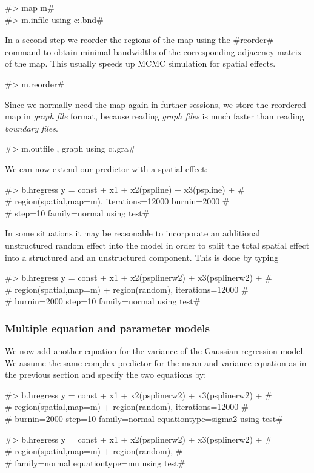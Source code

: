 #> map m# \\
#> m.infile using c:\maps\map.bnd#

In a second step we reorder the regions of the map using the
#reorder# command to obtain minimal bandwidths of the
corresponding adjacency matrix of the map. This usually speeds up
MCMC simulation for spatial effects.

#> m.reorder#

Since we normally need the map again in further sessions, we store
the reordered map in {\em graph file} format, because reading {\em
graph files} is much faster than reading {\em boundary files}.

#> m.outfile , graph using c:\maps\mapgraph.gra#

We can now extend our predictor with a spatial effect:

#> b.hregress y = const + x1 + x2(pspline) + x3(pspline) + # \\
#  region(spatial,map=m), iterations=12000 burnin=2000 #\\
#  step=10 family=normal using test#

In some situations it may be reasonable to incorporate  an
additional unstructured  random effect into the model in order to
split the total spatial effect into a structured and an
unstructured component. This is done by typing

#> b.hregress y = const + x1 + x2(psplinerw2) + x3(psplinerw2) + # \\
#   region(spatial,map=m) + region(random), iterations=12000 #\\
#  burnin=2000 step=10 family=normal using test#

\subsubsection{Multiple equation and parameter models}

We now add another equation for the variance of the Gaussian regression
model. We assume the same complex predictor for the mean and variance equation
as in the previous section and specify the two equations by:

#> b.hregress y = const + x1 + x2(psplinerw2) + x3(psplinerw2) + # \\
#   region(spatial,map=m) + region(random), iterations=12000 #\\
#  burnin=2000 step=10 family=normal equationtype=sigma2 using test#


#> b.hregress y = const + x1 + x2(psplinerw2) + x3(psplinerw2) + # \\
#   region(spatial,map=m) + region(random),  #\\
#  family=normal equationtype=mu using test#

